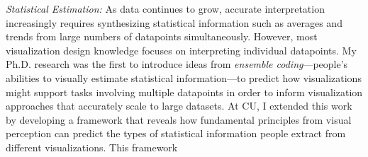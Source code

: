 \documentclass[11pt]{article}
\begin{document}
\emph{Statistical Estimation: }As data continues to grow, accurate interpretation increasingly requires synthesizing 
statistical information such as averages and trends from large numbers of datapoints simultaneously.
However, most visualization design knowledge focuses on interpreting individual datapoints.
My Ph.D. research was the first to introduce ideas from \emph{ensemble coding}---people's abilities to visually estimate statistical information---to predict how visualizations might support tasks involving multiple datapoints in order to inform visualization approaches that accurately scale to large datasets. 
At CU, I extended this work by developing a framework that reveals how fundamental principles from visual perception can predict the types of statistical information people extract from different visualizations. This framework 
\end{document}
